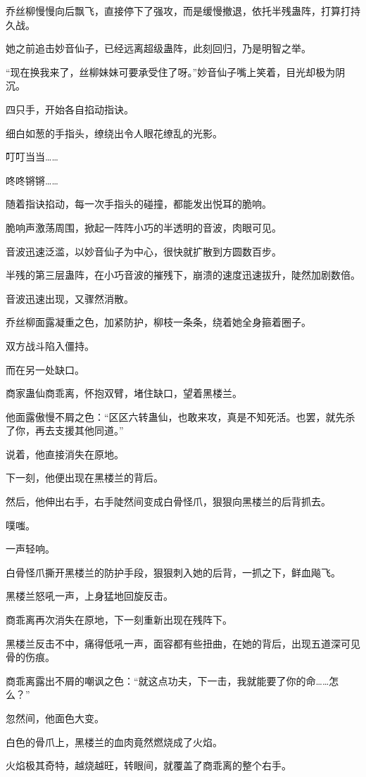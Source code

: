 \begin{this_body}
乔丝柳慢慢向后飘飞，直接停下了强攻，而是缓慢撤退，依托半残蛊阵，打算打持久战。

她之前追击妙音仙子，已经远离超级蛊阵，此刻回归，乃是明智之举。

“现在换我来了，丝柳妹妹可要承受住了呀。”妙音仙子嘴上笑着，目光却极为阴沉。

四只手，开始各自掐动指诀。

细白如葱的手指头，缭绕出令人眼花缭乱的光影。

叮叮当当……

咚咚锵锵……

随着指诀掐动，每一次手指头的碰撞，都能发出悦耳的脆响。

脆响声激荡周围，掀起一阵阵小巧的半透明的音波，肉眼可见。

音波迅速泛滥，以妙音仙子为中心，很快就扩散到方圆数百步。

半残的第三层蛊阵，在小巧音波的摧残下，崩溃的速度迅速拔升，陡然加剧数倍。

音波迅速出现，又骤然消散。

乔丝柳面露凝重之色，加紧防护，柳枝一条条，绕着她全身箍着圈子。

双方战斗陷入僵持。

而在另一处缺口。

商家蛊仙商乖离，怀抱双臂，堵住缺口，望着黑楼兰。

他面露傲慢不屑之色：“区区六转蛊仙，也敢来攻，真是不知死活。也罢，就先杀了你，再去支援其他同道。”

说着，他直接消失在原地。

下一刻，他便出现在黑楼兰的背后。

然后，他伸出右手，右手陡然间变成白骨怪爪，狠狠向黑楼兰的后背抓去。

噗嗤。

一声轻响。

白骨怪爪撕开黑楼兰的防护手段，狠狠刺入她的后背，一抓之下，鲜血飚飞。

黑楼兰怒吼一声，上身猛地回旋反击。

商乖离再次消失在原地，下一刻重新出现在残阵下。

黑楼兰反击不中，痛得低吼一声，面容都有些扭曲，在她的背后，出现五道深可见骨的伤痕。

商乖离露出不屑的嘲讽之色：“就这点功夫，下一击，我就能要了你的命……怎么？”

忽然间，他面色大变。

白色的骨爪上，黑楼兰的血肉竟然燃烧成了火焰。

火焰极其奇特，越烧越旺，转眼间，就覆盖了商乖离的整个右手。


\end{this_body}

